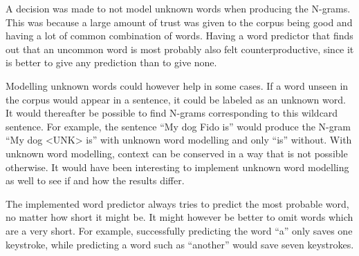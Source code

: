 A decision was made to not model unknown words when producing the N-grams. This was because a large amount of trust was given to the corpus being good and having a lot of common combination of words. Having a word predictor that finds out that an uncommon word is most probably also felt counterproductive, since it is better to give any prediction than to give none.

Modelling unknown words could however help in some cases. If a word unseen in the corpus would appear in a sentence, it could be labeled as an unknown word. It would thereafter be possible to find N-grams corresponding to this wildcard sentence. For example, the sentence “My dog Fido is” would produce the N-gram “My dog <UNK> is” with unknown word modelling and only “is” without. With unknown word modelling, context can be conserved in a way that is not possible otherwise. It would have been interesting to implement unknown word modelling as well to see if and how the results differ.

The implemented word predictor always tries to predict the most probable word, no matter how short it might be. It might however be better to omit words which are a very short. For example, successfully predicting the word “a” only saves one keystroke, while predicting a word such as “another” would save seven keystrokes.

